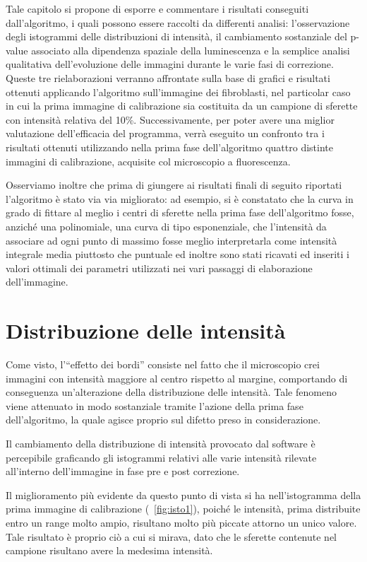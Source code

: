Tale capitolo si propone di esporre e commentare i risultati conseguiti dall'algoritmo, i quali possono essere raccolti da differenti analisi: l'osservazione degli istogrammi delle distribuzioni di intensità, il cambiamento sostanziale del p-value associato alla dipendenza spaziale della luminescenza e la semplice analisi qualitativa dell'evoluzione delle immagini durante le varie fasi di correzione.
Queste tre rielaborazioni verranno affrontate sulla base di grafici e risultati ottenuti applicando l'algoritmo sull'immagine dei fibroblasti, nel particolar caso in cui la prima immagine di calibrazione sia costituita da un campione di sferette con intensità relativa del 10\%.
Successivamente, per poter avere una miglior valutazione dell'efficacia del programma, verrà eseguito un confronto tra i risultati ottenuti utilizzando nella prima fase dell'algoritmo quattro distinte immagini di calibrazione, acquisite col microscopio a fluorescenza.

Osserviamo inoltre che prima di giungere ai risultati finali di seguito riportati l'algoritmo è stato via via migliorato: ad esempio, si è constatato che la curva in grado di fittare al meglio i centri di sferette nella prima fase dell'algoritmo fosse, anziché una polinomiale, una curva di tipo esponenziale, che l'intensità da associare ad ogni punto di massimo fosse meglio interpretarla come intensità integrale media piuttosto che puntuale ed inoltre sono stati ricavati ed inseriti i valori ottimali dei parametri utilizzati nei vari passaggi di elaborazione dell'immagine.

\section{Distribuzione delle intensità}

Come visto, l'``effetto dei bordi'' consiste nel fatto che il microscopio crei immagini con intensità maggiore al centro rispetto al margine, comportando di conseguenza un'alterazione della distribuzione delle intensità. 
Tale fenomeno viene attenuato in modo sostanziale tramite l'azione della prima fase dell'algoritmo, la quale agisce proprio sul difetto preso in considerazione.

Il cambiamento della distribuzione di intensità provocato dal software è percepibile graficando gli istogrammi relativi alle varie intensità rilevate all'interno dell'immagine in fase pre e post correzione.

Il miglioramento più evidente da questo punto di vista si ha nell'istogramma della prima immagine di calibrazione (\figurename~\ref{fig:isto1}), poiché le intensità, prima distribuite entro un range molto ampio, risultano molto più piccate attorno un unico valore.
Tale risultato è proprio ciò a cui si mirava, dato che le sferette contenute nel campione risultano avere la medesima intensità.

